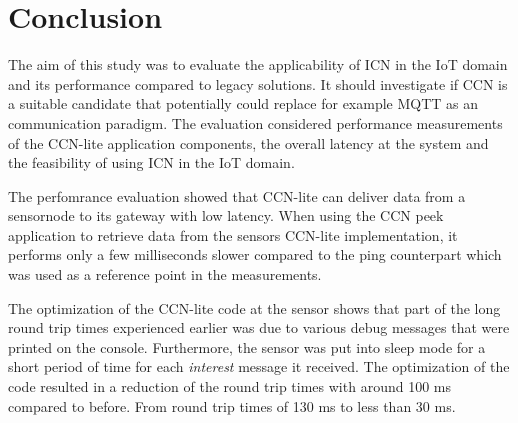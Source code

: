 \section{Conclusion}

%
%

The aim of this study was to evaluate the applicability of ICN in the IoT domain and its performance compared to legacy solutions. It should investigate if CCN is a suitable candidate that potentially could replace for example MQTT as an communication paradigm.
The evaluation considered performance measurements of the CCN-lite application components, the overall latency at the system and the feasibility of using ICN in the IoT domain.

The perfomrance evaluation showed that CCN-lite can deliver data from a sensornode to its gateway with low latency. When using the CCN peek application to retrieve data from the sensors CCN-lite implementation, it performs only a few milliseconds slower compared to the ping counterpart which was used as a reference point in the measurements.

The optimization of the CCN-lite code at the sensor shows that part of the long round trip times experienced earlier was due to various debug messages that were printed on the console. Furthermore, the sensor was put into sleep mode for a short period of time for each \textit{interest} message it received. The optimization of the code resulted in a reduction of the round trip times with around 100 ms compared to before. From round trip times of 130 ms to less than 30 ms.

